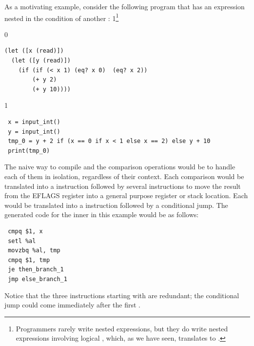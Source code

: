 \documentclass[7x10]{TimesAPriori_MIT}%
\def\racketEd{0}
\def\pythonEd{1}
\providecommand{\BookEdition}{1}
\let\edition\BookEdition
\newcommand{\pythonColor}[0]{}
\newcommand{\python}[1]{{\if\edition\pythonEd\pythonColor #1\fi}}
\numberwithin{theorem}{chapter}
\numberwithin{definition}{chapter}
\numberwithin{equation}{chapter}
\begin{document}
As a motivating example, consider the following \LangIfANF{} program that has an
 expression nested in the condition of another :%
\python{\footnote{Programmers rarely write nested 
    expressions, but they do write nested expressions involving
    logical \code{and}, which, as we have seen, translates to
    \code{if}.}}
\begin{center}
\begin{minipage}{0.96\textwidth}
{\if\edition\racketEd        
\begin{lstlisting}
(let ([x (read)])
  (let ([y (read)])
    (if (if (< x 1) (eq? x 0)  (eq? x 2))
        (+ y 2)
        (+ y 10))))
\end{lstlisting}
\fi}
{\if\edition\pythonEd\pythonColor
\begin{lstlisting}
 x = input_int()
 y = input_int()
 tmp_0 = y + 2 if (x == 0 if x < 1 else x == 2) else y + 10
 print(tmp_0)
\end{lstlisting}
\fi}
\end{minipage}
\end{center}
%
The naive way to compile  and the comparison operations would
be to handle each of them in isolation, regardless of their context.
Each comparison would be translated into a  instruction
followed by several instructions to move the result from the EFLAGS
register into a general purpose register or stack location. Each
 would be translated into a  instruction followed by
a conditional jump. The generated code for the inner  in this
example would be as follows:
\begin{center}
\begin{minipage}{0.96\textwidth}
\begin{lstlisting}
 cmpq $1, x
 setl %al
 movzbq %al, tmp
 cmpq $1, tmp
 je then_branch_1
 jmp else_branch_1
\end{lstlisting}
\end{minipage}
\end{center}
Notice that the three instructions starting with  are
redundant; the conditional jump could come immediately after the first
. 
\end{document}
